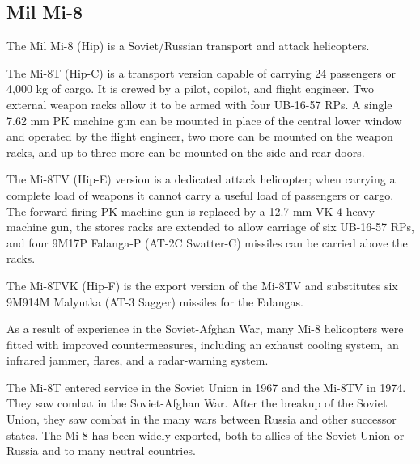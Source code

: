 
\subsection{Mil Mi-8}

The Mil Mi-8 (Hip) is a Soviet/Russian transport and attack helicopters.

The Mi-8T (Hip-C) is a transport version capable of carrying 24 passengers or 4,000 kg of cargo. It is crewed by a pilot, copilot, and flight engineer. Two external weapon racks allow it to be armed with four UB-16-57  RPs. A single 7.62 mm PK machine gun can be mounted in place of the central lower window and operated by the flight engineer, two more can be mounted on the weapon racks, and up to three more can be mounted on the side and rear doors. 

The Mi-8TV (Hip-E) version is a dedicated attack helicopter; when carrying a complete load of weapons it cannot carry a useful load of passengers or cargo. The forward firing PK machine gun is replaced by a 12.7 mm VK-4 heavy machine gun, the stores racks are extended to allow carriage of six UB-16-57  RPs, and four 9M17P Falanga-P (AT-2C Swatter-C) missiles can be carried above the racks. 

The Mi-8TVK (Hip-F) is the export version of the Mi-8TV and substitutes six 9M914M Malyutka (AT-3 Sagger) missiles for the Falangas.

As a result of experience in the Soviet-Afghan War, many Mi-8 helicopters were fitted with improved countermeasures, including an exhaust cooling system, an infrared jammer, flares, and a radar-warning system.

The Mi-8T entered service in the Soviet Union in 1967 and the Mi-8TV in 1974. They saw combat in the Soviet-Afghan War. After the breakup of the Soviet Union, they saw combat in the many wars between Russia and other successor states. The Mi-8 has been widely exported, both to allies of the Soviet Union or Russia and to many neutral countries.
